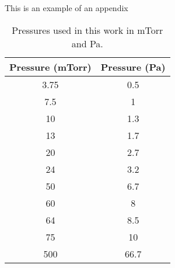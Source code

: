 This is an example of an appendix

\begin{table}[h!]
	\centering
	\begin{tabular}{|c|c|}
		\hline 
		\textbf{Pressure (mTorr)} & \textbf{Pressure (Pa)} \\ 
		\hline 
		3.75 & 0.5 \\ 
		7.5 & 1 \\ 
		10 & 1.3 \\ 
		13 & 1.7 \\ 
		20 & 2.7 \\ 
		24 & 3.2 \\ 
		50 & 6.7 \\ 
		60 & 8 \\ 
		64 & 8.5 \\ 
		75 & 10 \\ 
		500 & 66.7 \\ 
		\hline 
	\end{tabular} 
	\caption[Pressures used in this work in mTorr and Pa]{Pressures used in this work in mTorr and Pa.}
\end{table}